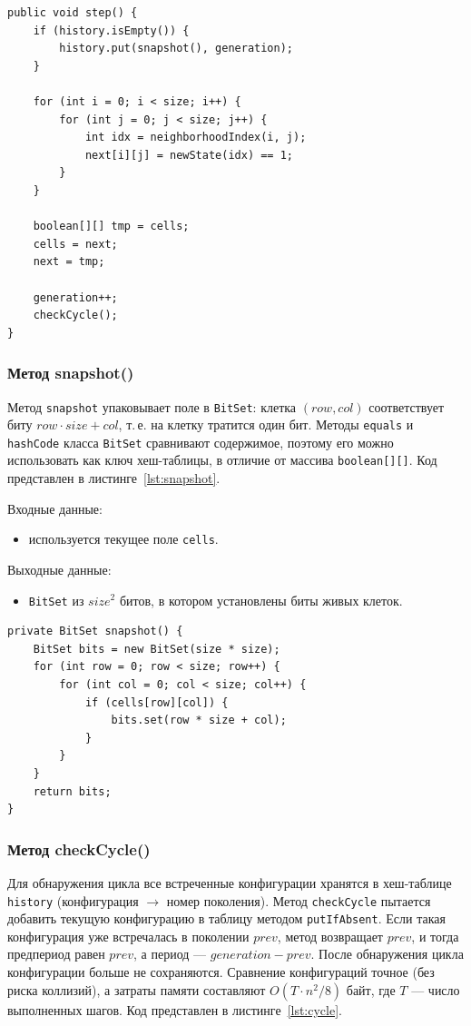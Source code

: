 \begin{lstlisting}[caption={Метод step()}, label={lst:step}]
public void step() {
	if (history.isEmpty()) {
		history.put(snapshot(), generation);
	}

	for (int i = 0; i < size; i++) {
		for (int j = 0; j < size; j++) {
			int idx = neighborhoodIndex(i, j);
			next[i][j] = newState(idx) == 1;
		}
	}

	boolean[][] tmp = cells;
	cells = next;
	next = tmp;

	generation++;
	checkCycle();
}
\end{lstlisting}

\subsubsection*{Метод snapshot()}

Метод \texttt{snapshot} упаковывает поле в \texttt{BitSet}: клетка $(row, col)$ соответствует биту $row \cdot size + col$, т.\,е. на клетку тратится один бит. Методы \texttt{equals} и \texttt{hashCode} класса \texttt{BitSet} сравнивают содержимое, поэтому его можно использовать как ключ хеш-таблицы, в отличие от массива \texttt{boolean[][]}. Код представлен в листинге~\ref{lst:snapshot}.

Входные данные:
\begin{itemize}
	\item используется текущее поле \texttt{cells}.
\end{itemize}

Выходные данные:
\begin{itemize}
	\item \texttt{BitSet} из $size^2$ битов, в котором установлены биты живых клеток.
\end{itemize}

\begin{lstlisting}[caption={Метод snapshot()}, label={lst:snapshot}]
private BitSet snapshot() {
	BitSet bits = new BitSet(size * size);
	for (int row = 0; row < size; row++) {
		for (int col = 0; col < size; col++) {
			if (cells[row][col]) {
				bits.set(row * size + col);
			}
		}
	}
	return bits;
}
\end{lstlisting}

\subsubsection*{Метод checkCycle()}

Для обнаружения цикла все встреченные конфигурации хранятся в хеш-таблице \texttt{history} (конфигурация $\to$ номер поколения). Метод \texttt{checkCycle} пытается добавить текущую конфигурацию в таблицу методом \texttt{putIfAbsent}. Если такая конфигурация уже встречалась в поколении $prev$, метод возвращает $prev$, и тогда предпериод равен $prev$, а период --- $generation - prev$. После обнаружения цикла конфигурации больше не сохраняются. Сравнение конфигураций точное (без риска коллизий), а затраты памяти составляют $O(T \cdot n^2 / 8)$ байт, где $T$ --- число выполненных шагов. Код представлен в листинге~\ref{lst:cycle}.

